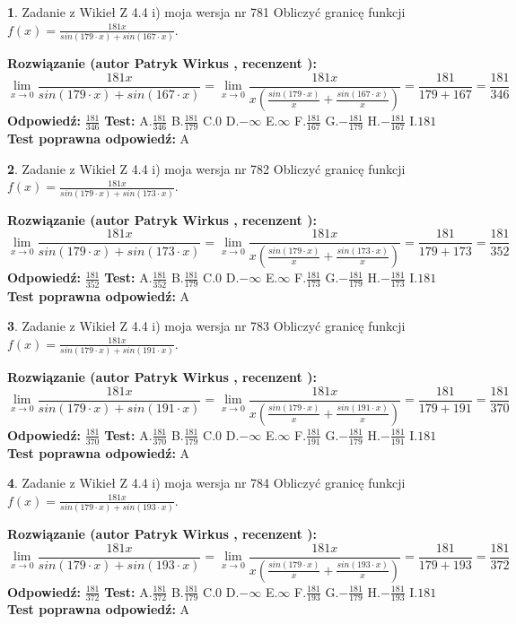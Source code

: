 \documentclass[12pt, a4paper]{article}
\theoremstyle{definition} %
\newtheorem{zad}{}
\newcommand{\zadStart}[1]{\begin{zad}#1\newline}
\newcommand{\zadStop}{\end{zad}}
\newcommand{\rozwStart}[2]{\noindent \textbf{Rozwiązanie (autor #1 , recenzent #2): }\newline}
\newcommand{\rozwStop}{\newline}
\newcommand{\odpStart}{\noindent \textbf{Odpowiedź:}\newline}
\newcommand{\odpStop}{\newline}
\newcommand{\testStart}{\noindent \textbf{Test:}\newline}
\newcommand{\testStop}{\newline}
\newcommand{\kluczStart}{\noindent \textbf{Test poprawna odpowiedź:}\newline}
\newcommand{\kluczStop}{\newline}
\begin{document}
\zadStart{Zadanie z Wikieł Z 4.4 i) moja wersja nr 781}
Obliczyć granicę funkcji $f(x)=\frac{181x}{sin(179\cdot x) +sin(167\cdot x)}$.
\zadStop
\rozwStart{Patryk Wirkus}{}
$$\lim\limits_{x\to 0}\frac{181x}{sin(179\cdot x) +sin(167\cdot x)}=\lim\limits_{x\to 0}\frac{181x}{x(\frac{sin(179\cdot x)}{x}+\frac{sin(167\cdot x)}{x})}=\frac{181}{179+167} = \frac{181}{346}$$
\rozwStop
\odpStart
$\frac{181}{346}$
\odpStop
\testStart
A.$\frac{181}{346}$
B.$\frac{181}{179}$
C.$0$
D.$-\infty$
E.$\infty$
F.$\frac{181}{167}$
G.$-\frac{181}{179}$
H.$-\frac{181}{167}$
I.$181$
\testStop
\kluczStart
A
\kluczStop



\zadStart{Zadanie z Wikieł Z 4.4 i) moja wersja nr 782}
Obliczyć granicę funkcji $f(x)=\frac{181x}{sin(179\cdot x) +sin(173\cdot x)}$.
\zadStop
\rozwStart{Patryk Wirkus}{}
$$\lim\limits_{x\to 0}\frac{181x}{sin(179\cdot x) +sin(173\cdot x)}=\lim\limits_{x\to 0}\frac{181x}{x(\frac{sin(179\cdot x)}{x}+\frac{sin(173\cdot x)}{x})}=\frac{181}{179+173} = \frac{181}{352}$$
\rozwStop
\odpStart
$\frac{181}{352}$
\odpStop
\testStart
A.$\frac{181}{352}$
B.$\frac{181}{179}$
C.$0$
D.$-\infty$
E.$\infty$
F.$\frac{181}{173}$
G.$-\frac{181}{179}$
H.$-\frac{181}{173}$
I.$181$
\testStop
\kluczStart
A
\kluczStop



\zadStart{Zadanie z Wikieł Z 4.4 i) moja wersja nr 783}
Obliczyć granicę funkcji $f(x)=\frac{181x}{sin(179\cdot x) +sin(191\cdot x)}$.
\zadStop
\rozwStart{Patryk Wirkus}{}
$$\lim\limits_{x\to 0}\frac{181x}{sin(179\cdot x) +sin(191\cdot x)}=\lim\limits_{x\to 0}\frac{181x}{x(\frac{sin(179\cdot x)}{x}+\frac{sin(191\cdot x)}{x})}=\frac{181}{179+191} = \frac{181}{370}$$
\rozwStop
\odpStart
$\frac{181}{370}$
\odpStop
\testStart
A.$\frac{181}{370}$
B.$\frac{181}{179}$
C.$0$
D.$-\infty$
E.$\infty$
F.$\frac{181}{191}$
G.$-\frac{181}{179}$
H.$-\frac{181}{191}$
I.$181$
\testStop
\kluczStart
A
\kluczStop



\zadStart{Zadanie z Wikieł Z 4.4 i) moja wersja nr 784}
Obliczyć granicę funkcji $f(x)=\frac{181x}{sin(179\cdot x) +sin(193\cdot x)}$.
\zadStop
\rozwStart{Patryk Wirkus}{}
$$\lim\limits_{x\to 0}\frac{181x}{sin(179\cdot x) +sin(193\cdot x)}=\lim\limits_{x\to 0}\frac{181x}{x(\frac{sin(179\cdot x)}{x}+\frac{sin(193\cdot x)}{x})}=\frac{181}{179+193} = \frac{181}{372}$$
\rozwStop
\odpStart
$\frac{181}{372}$
\odpStop
\testStart
A.$\frac{181}{372}$
B.$\frac{181}{179}$
C.$0$
D.$-\infty$
E.$\infty$
F.$\frac{181}{193}$
G.$-\frac{181}{179}$
H.$-\frac{181}{193}$
I.$181$
\testStop
\kluczStart
A
\kluczStop
\end{document}

